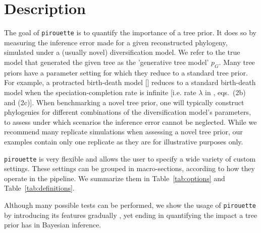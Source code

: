 \section{Description}

The goal of \verb;pirouette; is to quantify the importance of a tree prior.
It does so by measuring the inference error made 
for a given reconstructed phylogeny, 
simulated under a (usually novel) diversification model.
We refer to the true model that generated the given tree
as the 'generative tree model' $\mathit{p_{G}}$.
Many tree priors have a parameter setting 
for which they reduce to a standard tree prior. 
For example, a protracted birth-death model [\cite{etienne2012prolonging}] reduces to a standard birth-death model when the speciation-completion rate 
is infinite [i.e. rate $\lambda$ in \cite{etienne2014estimating}, 
eqs.~(2b) and (2c)].
When benchmarking a novel tree prior, 
one will typically construct phylogenies 
for different combinations of the diversification model's parameters, 
to assess under which scenarios the inference error cannot be neglected. 
While we recommend many replicate simulations 
when assessing a novel tree prior, 
our examples contain only one replicate 
as they are for illustrative purposes only. 

\verb;pirouette; is very flexible and allows the user 
to specify a wide variety of custom settings. 
These settings can be grouped in macro-sections, 
according to how they operate in the pipeline. 
We summarize them in Table~\ref{tab:options} and Table~\ref{tab:definitions}.

Although many possible tests can be performed, 
we show the usage of \verb;pirouette; by introducing 
its features gradually , yet ending in quantifying the impact a tree prior has in Bayesian inference.

